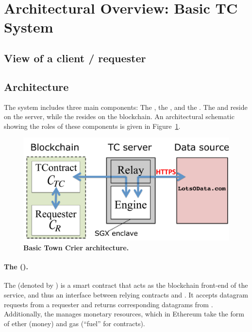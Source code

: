 \section{Architectural Overview: Basic TC System}

\subsection{View of a client / requester}

\subsection{Architecture}

The \tcs system includes three main components: The \tcontract, the \encname, and the \medname. The \encname and \medname reside on the \tc server, while the \tcontract resides on the blockchain. An architectural schematic showing the roles of these components is given in Figure~\ref{fig:overview}.

\vspace{-2mm}
\begin{figure}[h!]
\centering
\includegraphics[width=\columnwidth]{figures/OverviewFig}
\caption{{\bf Basic Town Crier architecture.}}
\label{fig:overview}
\end{figure}
\vspace{-2mm}

\paragraph{The \tcontract (\tcont).} The \tcontract (denoted by \tcont) is a smart contract that acts as the blockchain front-end of the \tc service, and thus an interface between relying contracts and \tc. It accepts datagram requests from a requester \reqcont and returns corresponding datagrams from \tc. Additionally, the \tcontract manages \tc monetary resources, which in Ethereum take the form of ether (money) and gas (``fuel'' for contracts). 

